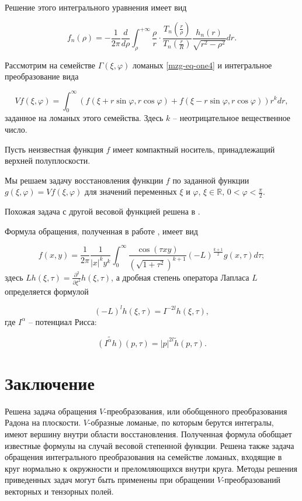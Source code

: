 Решение этого интегрального уравнения имеет вид

$$f_n(\rho)=-\frac{1}{2\pi}\frac{d}{d\rho}\int_\rho^{+\infty}\frac{\rho}{r}\cdot\frac{T_n\left(\frac{r}{\rho}\right)}{T_n\left(\frac{r}{R}\right)}\frac{h_n(r)}{\sqrt{r^2-\rho^2}}dr.$$

Рассмотрим на семействе $\Gamma(\xi,\varphi)$ ломаных \eqref{mzg-eq-one4} и интегральное преобразование вида

\begin{equation}
\label{mzg-eq-one5}
Vf(\xi,\varphi)=\int_0^\infty\left( f(\xi+ r \sin \varphi, r \cos \varphi)+f(\xi-r \sin \varphi, r \cos \varphi)\right)r^k dr,
\end{equation}
заданное на ломаных этого семейства. Здесь $k$ -- неотрицательное вещественное число.

Пусть неизвестная функция $f$ имеет компактный носитель, принадлежащий верхней полуплоскости.

Мы решаем задачу восстановления функции $f$ по заданной функции $g(\xi,\varphi)=Vf(\xi,\varphi)$ для значений переменных $\xi$ и $\varphi$, $\xi\in\mathbb R,\, 0<\varphi<\frac{\pi}{2}$.

Похожая задача с другой весовой функцией решена в \cite{mzg-Kuchment}.

Формула обращения, полученная в работе \cite{mzg-Medzhidov2}, имеет вид

\begin{equation}
\label{mzg-eq-one8}
f(x,y)=\frac{1}{2\pi}\frac{1}{|x|^k y^k}\int_0^\infty \frac{\cos (\tau xy) }{\left(\sqrt{1+\tau^2}\right)^{k+1}}(-L)^{\frac{k+1}{2}}g(x,\tau)d\tau;
\end{equation}
здесь $Lh(\xi,\tau)=\frac{\partial^2}{\partial\xi^2 }h(\xi,\tau)$, а дробная степень оператора Лапласа $L$ определяется формулой

$$(-L)^lh(\xi,\tau)=I^{-2l}h(\xi,\tau),$$
где $I^\alpha$ -- потенциал Рисса:

$$\widetilde{\left(I^\alpha h\right)}(p,\tau)=|p|^{2l}\tilde h(p,\tau).$$


\section{Заключение}
Решена задача обращения $V$-преобразования, или обобщенного преобразования Радона на плоскости. $V$-образные ломаные, по которым берутся интегралы, имеют вершину внутри области восстановления. Полученная формула обобщает известные формулы на случай весовой степенной функции.  Решена также задача обращения интегрального преобразования на семействе ломаных, входящие в круг нормально к окружности и преломляющихся внутри круга.
Методы решения приведенных задач могут быть применены при обращении $V$-преобразований векторных и тензорных полей.





